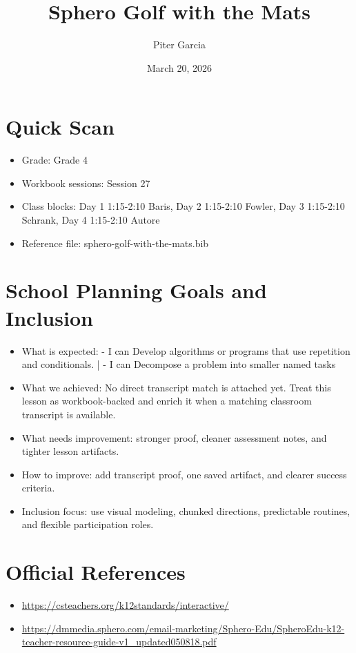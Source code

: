 \documentclass[11pt]{article}
\title{Sphero Golf with the Mats}
\author{Piter Garcia}
\date{March 20, 2026}
\begin{document}
    \maketitle
    \section*{Quick Scan}
    \begin{itemize}[leftmargin=*]
    \item Grade: Grade 4
    \item Workbook sessions: Session 27
    \item Class blocks: Day 1 1:15-2:10 Baris, Day 2 1:15-2:10 Fowler, Day 3 1:15-2:10 Schrank, Day 4 1:15-2:10 Autore
    \item Reference file: sphero-golf-with-the-mats.bib
    \end{itemize}
    \section*{School Planning Goals and Inclusion}
    \begin{itemize}[leftmargin=*]
    \item What is expected: - I can Develop algorithms or programs that use repetition and conditionals. | - I can Decompose a problem into smaller named tasks
    \item What we achieved: No direct transcript match is attached yet. Treat this lesson as workbook-backed and enrich it when a matching classroom transcript is available.
    \item What needs improvement: stronger proof, cleaner assessment notes, and tighter lesson artifacts.
    \item How to improve: add transcript proof, one saved artifact, and clearer success criteria.
    \item Inclusion focus: use visual modeling, chunked directions, predictable routines, and flexible participation roles.
    \end{itemize}
    \section*{Official References}
    \begin{itemize}[leftmargin=*]
    \item \url{https://csteachers.org/k12standards/interactive/}
\item \url{https://dmmedia.sphero.com/email-marketing/Sphero-Edu/SpheroEdu-k12-teacher-resource-guide-v1_updated050818.pdf}

    \end{itemize}
    
\end{document}
